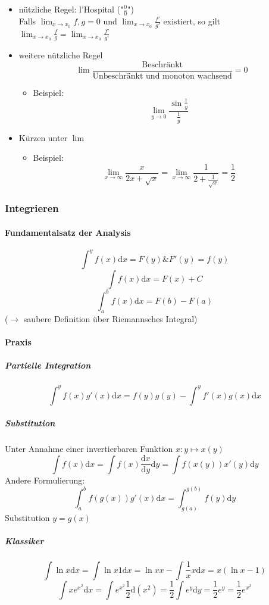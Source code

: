 \documentclass[a4paper]{scrartcl}
\theoremstyle{definition}
\theoremstyle{plain}
\theoremstyle{remark}
\theoremstyle{remark}
\begin{document}
\begin{itemize}
\begin{itemize}
\item nützliche Regel: l'Hospital ("$\frac{0}{0}$") \\
        Falls $\lim_{x\to x_0} f,g = 0$ und $\lim_{x\to x_0} \frac{f'}{g'}$ existiert, so gilt $\lim_{x\to x_0}\frac{f}{g} = \lim_{x\to x_0} \frac{f'}{g'}$
\item weitere nützliche Regel \[\lim \frac{\text{Beschränkt}}{\text{Unbeschränkt und monoton wachsend}} = 0\]
\begin{itemize}
\item Beispiel: \[\lim_{y\to 0} \frac{\sin{\frac{1}{y}}}{\frac{1}{y}}\]
\end{itemize}
\item Kürzen unter $\lim$
\begin{itemize}
\item Beispiel: \[\lim_{x\to\infty} \frac{x}{2x + \sqrt{x}} = \lim_{x\to\infty}\frac{1}{2+\frac{1}{\sqrt{x}}} = \frac{1}{2}\]
\end{itemize}
\end{itemize}
\end{itemize}
\subsubsection{Integrieren}
\label{sec-2-2-3}
\paragraph{Fundamentalsatz der Analysis}
\label{sec-2-2-3-1}
\[\int^y f(x)\mathrm{d}x = F(y) \&  F'(y) = f(y)\]
\[\int f(x)\mathrm{d}x = F(x) + C\]
\[\int_a^b f(x)\mathrm{d}x = F(b) - F(a)\]
($\to$ saubere Definition über Riemannsches Integral)
\paragraph{Praxis}
\label{sec-2-2-3-2}
\subparagraph{Partielle Integration}
\label{sec-2-2-3-2-1}
\[\int^y f(x)g'(x)\mathrm{d}x = f(y)g(y) - \int^y f'(x)g(x)\mathrm{d}x\]
\subparagraph{Substitution}
\label{sec-2-2-3-2-2}
Unter Annahme einer invertierbaren Funktion $x: y\mapsto x(y)$
\[\int f(x)\mathrm{d}x = \int f(x)\frac{\mathrm{d}x}{\mathrm{d}y}\mathrm{d}y = \int f(x(y)) x'(y)\mathrm{d}y\]
Andere Formulierung: \[\int_a^b f(g(x))g'(x)\mathrm{d}x = \int_{g(a)}^{g(b)}f(y)\mathrm{d}y\]
Substitution $y=g(x)$
\subparagraph{Klassiker}
\label{sec-2-2-3-2-3}
\[\int \ln{x}\mathrm{d}x = \int \ln{x}1\mathrm{d}x = \ln{x}x - \int \frac{1}{x}x\mathrm{d}x = x(\ln{x} - 1)\]
\[\int x e^{x^2}\mathrm{d}x = \int e^{x^2}\frac{1}{2}\mathrm{d}(x^2) = \frac{1}{2}\int e^y \mathrm{d}y = \frac{1}{2}e^y = \frac{1}{2}e^{x^2}\]
\end{document}
